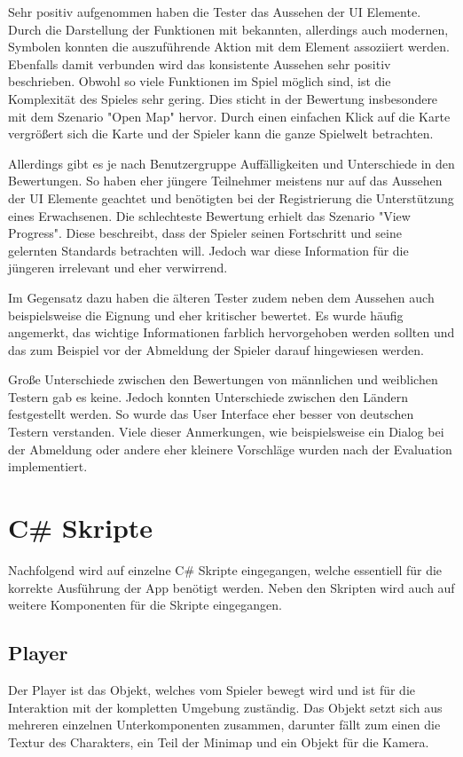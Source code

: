 				Sehr positiv aufgenommen haben die Tester das Aussehen der \ac{UI} Elemente. Durch die Darstellung der Funktionen mit bekannten, allerdings auch modernen, Symbolen konnten die auszuführende Aktion mit dem Element assoziiert werden. Ebenfalls damit verbunden wird das konsistente Aussehen sehr positiv beschrieben. Obwohl so viele Funktionen im Spiel möglich sind, ist die Komplexität des Spieles sehr gering. Dies sticht in der Bewertung insbesondere mit dem Szenario "Open Map" hervor. Durch einen einfachen Klick auf die Karte vergrößert sich die Karte und der Spieler kann die ganze Spielwelt betrachten.

				Allerdings gibt es je nach Benutzergruppe Auffälligkeiten und Unterschiede in den Bewertungen. So haben eher jüngere Teilnehmer meistens nur auf das Aussehen der \ac{UI} Elemente geachtet und benötigten bei der Registrierung die Unterstützung eines Erwachsenen. Die schlechteste Bewertung erhielt das Szenario "View Progress". Diese beschreibt, dass der Spieler seinen Fortschritt und seine gelernten Standards betrachten will. Jedoch war diese Information für die jüngeren irrelevant und eher verwirrend.

				Im Gegensatz dazu haben die älteren Tester zudem neben dem Aussehen auch beispielsweise die Eignung und eher kritischer bewertet. Es wurde häufig angemerkt, das wichtige Informationen farblich hervorgehoben werden sollten und das zum Beispiel vor der Abmeldung der Spieler darauf hingewiesen werden.

				Große Unterschiede zwischen den Bewertungen von männlichen und weiblichen Testern gab es keine. Jedoch konnten Unterschiede zwischen den Ländern festgestellt werden. So wurde das User Interface eher besser von deutschen Testern verstanden. Viele dieser Anmerkungen, wie beispielsweise ein Dialog bei der Abmeldung oder andere eher kleinere Vorschläge wurden nach der Evaluation implementiert.
\newpage
	\section{C\# Skripte}
		Nachfolgend wird auf einzelne C\# Skripte eingegangen, welche essentiell für die korrekte Ausführung der App benötigt werden. Neben den Skripten wird auch auf weitere Komponenten für die Skripte eingegangen.

		\subsection{Player}
			Der Player ist das Objekt, welches vom Spieler bewegt wird und ist für die Interaktion mit der kompletten Umgebung zuständig. Das Objekt setzt sich aus mehreren einzelnen Unterkomponenten zusammen, darunter fällt zum einen die Textur des Charakters, ein Teil der Minimap und ein Objekt für die Kamera. 
	

